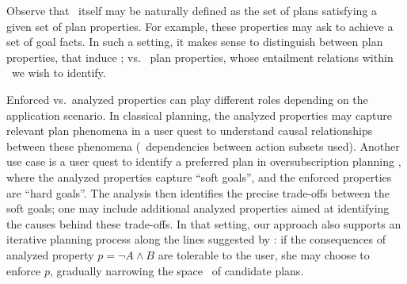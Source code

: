 Observe that \plans\ itself may be naturally defined as the set of
plans satisfying a given set of plan properties. For example, these
properties may ask to achieve a set of goal facts. In such a setting,
it makes sense to distinguish between  plan
properties, that induce \plans; vs.\  plan
properties, whose entailment relations within \plans\ we wish to
identify. 

Enforced vs.\ analyzed properties can play different roles depending
on the application scenario. In classical planning, the analyzed
properties may capture relevant plan phenomena in a user quest to
understand causal relationships between these phenomena
(\eg\ dependencies between action subsets used). Another use case is a
user quest to identify a preferred plan in oversubscription planning
\cite{smith:icaps-04,domshlak:mirkis:jair-15}, where the analyzed
properties capture ``soft goals'', and the enforced properties are
``hard goals''. The analysis then identifies the precise trade-offs
between the soft goals; one may include additional analyzed properties
aimed at identifying the causes behind these trade-offs. In that
setting, our approach also supports an iterative planning process
along the lines suggested by \cite{smith:aaai-12}: if the consequences
of analyzed property $p = \neg A \wedge B$ are tolerable to the user,
she may choose to enforce $p$, gradually narrowing the space
\plans\ of candidate plans.




